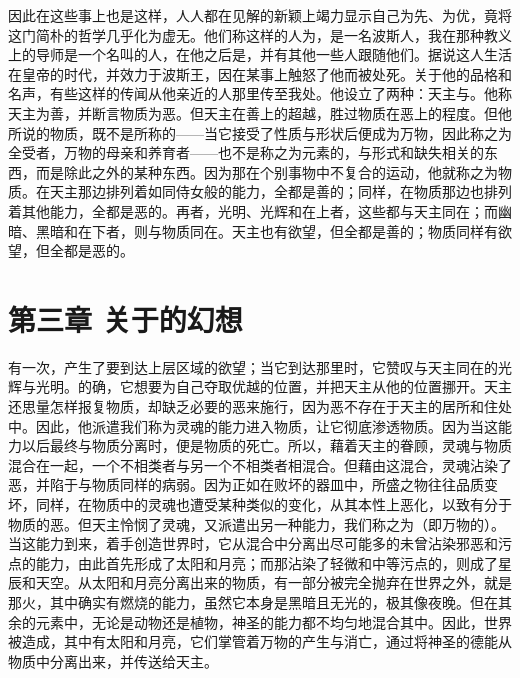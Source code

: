 因此在这些事上也是这样，人人都在见解的新颖上竭力显示自己为先、为优，竟将这门简朴的哲学几乎化为虚无。他们称这样的人为，是一名波斯人，我在那种教义上的导师是一个名叫的人，在他之后是，并有其他一些人跟随他们。据说这人生活在皇帝的时代，并效力于波斯王，因在某事上触怒了他而被处死。关于他的品格和名声，有些这样的传闻从他亲近的人那里传至我处。他设立了两种：天主与。他称天主为善，并断言物质为恶。但天主在善上的超越，胜过物质在恶上的程度。但他所说的物质，既不是所称的——当它接受了性质与形状后便成为万物，因此称之为全受者，万物的母亲和养育者——也不是称之为元素的，与形式和缺失相关的东西，而是除此之外的某种东西。因为那在个别事物中不复合的运动，他就称之为物质。在天主那边排列着如同侍女般的能力，全都是善的；同样，在物质那边也排列着其他能力，全都是恶的。再者，光明、光辉和在上者，这些都与天主同在；而幽暗、黑暗和在下者，则与物质同在。天主也有欲望，但全都是善的；物质同样有欲望，但全都是恶的。\par


\section{第三章 关于的幻想}

有一次，产生了要到达上层区域的欲望；当它到达那里时，它赞叹与天主同在的光辉与光明。的确，它想要为自己夺取优越的位置，并把天主从他的位置挪开。天主还思量怎样报复物质，却缺乏必要的恶来施行，因为恶不存在于天主的居所和住处中。因此，他派遣我们称为灵魂的能力进入物质，让它彻底渗透物质。因为当这能力以后最终与物质分离时，便是物质的死亡。所以，藉着天主的眷顾，灵魂与物质混合在一起，一个不相类者与另一个不相类者相混合。但藉由这混合，灵魂沾染了恶，并陷于与物质同样的病弱。因为正如在败坏的器皿中，所盛之物往往品质变坏，同样，在物质中的灵魂也遭受某种类似的变化，从其本性上恶化，以致有分于物质的恶。但天主怜悯了灵魂，又派遣出另一种能力，我们称之为（即万物的）。当这能力到来，着手创造世界时，它从混合中分离出尽可能多的未曾沾染邪恶和污点的能力，由此首先形成了太阳和月亮；而那沾染了轻微和中等污点的，则成了星辰和天空。从太阳和月亮分离出来的物质，有一部分被完全抛弃在世界之外，就是那火，其中确实有燃烧的能力，虽然它本身是黑暗且无光的，极其像夜晚。但在其余的元素中，无论是动物还是植物，神圣的能力都不均匀地混合其中。因此，世界被造成，其中有太阳和月亮，它们掌管着万物的产生与消亡，通过将神圣的德能从物质中分离出来，并传送给天主。\par

